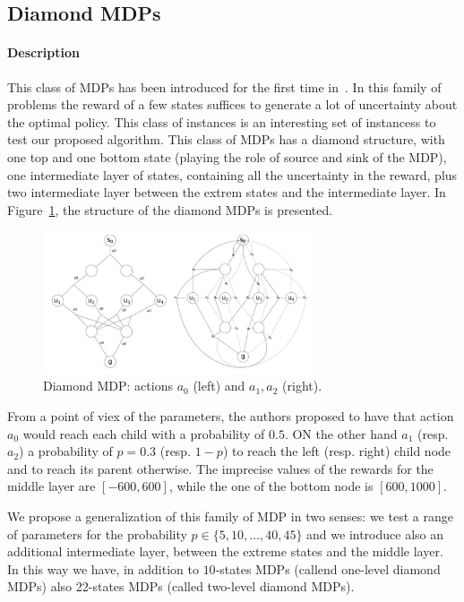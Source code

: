   




\subsection{Diamond MDPs}
\paragraph{Description}
This class of MDPs has been introduced for the first time in~\cite{benavent2018}. 
In this family of problems the reward of a few states suffices to generate a lot of uncertainty about the optimal policy. This class of instances is an interesting set of instancess to test our proposed algorithm.
This class of MDPs has a diamond structure, with one top and one bottom state (playing the role of source and sink of the  MDP), one intermediate layer of states, containing all the uncertainty in the reward, plus two intermediate layer between the extrem states and the intermediate layer.
In Figure~\ref{fig:diamond}, the structure of the diamond MDPs is presented.

\begin{figure}[h]
\begin{center}
\includegraphics[width=8cm]{images/diamond.png}
\end{center}
\caption{Diamond MDP: actions $a_0$ (left) and $a_1, a_2$ (right).}
\label{fig:diamond}
\end{figure}

From a point of viex of the parameters, the authors proposed to have that action $a_0$ would reach each child with a probability of $0.5$. ON the other hand $a_1$ (resp. $a_2$) a probability of $p= 0.3$ (resp. $1-p$) to reach the left (resp. right) child node and to reach its parent otherwise.
The imprecise values of the rewards for the middle layer are $[-600,600]$, while the one of the bottom node is $[600,1000]$.

We propose a generalization of this family of MDP in two senses: we test a range of parameters for the probability $p \in \{5,10,\dots,40,45\}$ and we introduce also an additional intermediate layer, between the extreme states and the middle layer. In this way we have, in addition to $10$-states MDPs (callend one-level diamond MDPs) also  22-states MDPs (called two-level diamond MDPs). 

